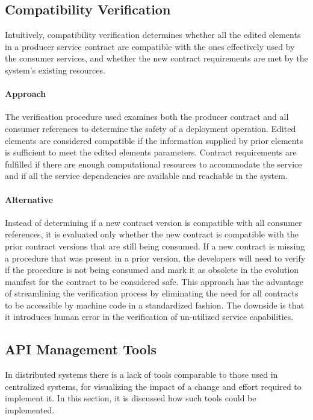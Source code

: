 \subsection{Compatibility Verification} %
\label{sec:compatibility_verification_design}

Intuitively, compatibility verification determines whether
all the edited elements in a producer service contract are compatible with the ones effectively
used by the consumer services, and whether the new contract requirements are met
by the system’s existing resources.

\paragraph{Approach}
The verification procedure used examines both the producer contract and all consumer references to determine the safety of a deployment operation.
Edited elements are considered compatible if the information supplied by prior elements is sufficient to meet the edited elements parameters.
Contract requirements are fulfilled if there are enough computational resources to accommodate the service and if all the
service dependencies are available and reachable in the system.

\paragraph{Alternative}
Instead of determining if a new contract version is compatible with all consumer references,
it is evaluated only whether the new contract is compatible with the prior contract versions that are still being consumed.
If a new contract is missing a procedure that was present in a prior version,
the developers will need to verify if the procedure is not being consumed
and mark it as obsolete in the evolution manifest for the contract to be considered safe.
This approach has the advantage of streamlining the verification process by eliminating the
need for all contracts to be accessible by machine code in a standardized fashion.
The downside is that it introduces human error in the verification of un-utilized service capabilities.

\subsection{API Management Tools} %
\label{sec:tools}

In distributed systems there is a lack of tools
comparable to those used in centralized systems, for visualizing the impact of a change and effort required to implement it.
In this section, it is discussed how such tools could be implemented.

